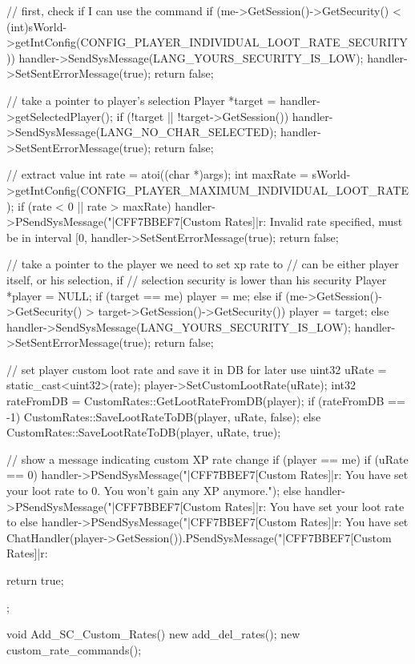 {{		// first, check if I can use the command
		if (me->GetSession()->GetSecurity() < (int)sWorld->getIntConfig(CONFIG_PLAYER_INDIVIDUAL_LOOT_RATE_SECURITY))
		{
			handler->SendSysMessage(LANG_YOURS_SECURITY_IS_LOW);
			handler->SetSentErrorMessage(true);
			return false;
		}

		// take a pointer to player's selection
		Player *target = handler->getSelectedPlayer();
		if (!target || !target->GetSession())
		{
			handler->SendSysMessage(LANG_NO_CHAR_SELECTED);
			handler->SetSentErrorMessage(true);
			return false;
		}

		// extract value
		int rate = atoi((char *)args);
		int maxRate = sWorld->getIntConfig(CONFIG_PLAYER_MAXIMUM_INDIVIDUAL_LOOT_RATE);
		if (rate < 0 || rate > maxRate)
		{
			handler->PSendSysMessage("|CFF7BBEF7[Custom Rates]|r: Invalid rate specified, must be in interval [0,%
			handler->SetSentErrorMessage(true);
			return false;
		}

		// take a pointer to the player we need to set xp rate to
		// can be either player itself, or his selection, if
		// selection security is lower than his security
		Player *player = NULL;
		if (target == me)
			player = me;
		else
		{
			if (me->GetSession()->GetSecurity() > target->GetSession()->GetSecurity())
				player = target;
			else
			{
				handler->SendSysMessage(LANG_YOURS_SECURITY_IS_LOW);
				handler->SetSentErrorMessage(true);
				return false;
			}
		}

		// set player custom loot rate and save it in DB for later use
		uint32 uRate = static_cast<uint32>(rate);
		player->SetCustomLootRate(uRate);
		int32 rateFromDB = CustomRates::GetLootRateFromDB(player);
		if (rateFromDB == -1)
			CustomRates::SaveLootRateToDB(player, uRate, false);
		else
			CustomRates::SaveLootRateToDB(player, uRate, true);

		// show a message indicating custom XP rate change
		if (player == me)
		{
			if (uRate == 0)
				handler->PSendSysMessage("|CFF7BBEF7[Custom Rates]|r: You have set your loot rate to 0. You won't gain any XP anymore.");
			else
				handler->PSendSysMessage("|CFF7BBEF7[Custom Rates]|r: You have set your loot rate to %
		}
		else
		{
			handler->PSendSysMessage("|CFF7BBEF7[Custom Rates]|r: You have set %
			ChatHandler(player->GetSession()).PSendSysMessage("|CFF7BBEF7[Custom Rates]|r: %
		}

		return true;
	}
};

void Add_SC_Custom_Rates()
{
	new add_del_rates();
	new custom_rate_commands();
}
